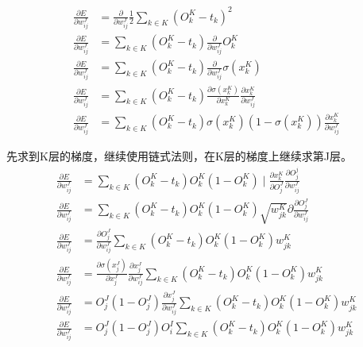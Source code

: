 \documentclass{ctexart}
\begin{document}
\begin{equation}
    \begin{aligned}
    \frac{\partial E}{\partial w_{i j}^{J}} &=\frac{\partial}{\partial w_{i j}^{J}} \frac{1}{2} \sum_{k \in K}\left(O_{k}^{K}-t_{k}\right)^{2} \\
    \frac{\partial E}{\partial w_{i j}^{J}} &=\sum_{k \in K}\left(O_{k}^{K}-t_{k}\right) \frac{\partial}{\partial w_{i j}^{J}} O_{k}^{K} \\
    \frac{\partial E}{\partial w_{i j}^{J}} &=\sum_{k \in K}\left(O_{k}^{K}-t_{k}\right) \frac{\partial}{\partial w_{i j}^{J}} \sigma\left(x_{k}^{K}\right) \\
    \frac{\partial E}{\partial w_{i j}^{J}} &=\sum_{k \in K}\left(O_{k}^{K}-t_{k}\right) \frac{\partial \sigma\left(x_{k}^{K}\right)}{\partial x_{k}^{K}} \frac{\partial x_{k}^{K}}{\partial w_{i j}^{J}} \\
    \frac{\partial E}{\partial w_{i j}^{J}} &=\sum_{k \in K}\left(O_{k}^{K}-t_{k}\right) \sigma\left(x_{k}^{K}\right)\left(1-\sigma\left(x_{k}^{K}\right)\right) \frac{\partial x_{k}^{K}}{\partial w_{i j}^{J}}
    \end{aligned}
    \end{equation}
\par 先求到K层的梯度，继续使用链式法则，在K层的梯度上继续求第J层。
\begin{equation}
    \begin{aligned}
    \frac{\partial E}{\partial w_{i j}^{J}} &=\sum_{k \in K}\left(O_{k}^{K}-t_{k}\right) O_{k}^{K}\left(1-O_{k}^{K}\right) \mid \frac{\partial x_{k}^{K}}{\partial O_{j}^{J}} \frac{\partial O_{j}^{j}}{\partial w_{i j}^{J}} \\
    \frac{\partial E}{\partial w_{i j}^{J}} &=\sum_{k \in K}\left(O_{k}^{K}-t_{k}\right) O_{k}^{K}\left(1-O_{k}^{K}\right) \sqrt{w_{j k}^{K}}{\partial \frac{\partial O_{j}^{J}}{\partial w_{i j}^{J}}} \\
    \frac{\partial E}{\partial w_{i j}^{J}} &=\frac{\partial O_{j}^{J}}{\partial w_{i j}^{J}} \sum_{k \in K}\left(O_{k}^{K}-t_{k}\right) O_{k}^{K}\left(1-O_{k}^{K}\right) w_{j k}^{K} \\
    \frac{\partial E}{\partial w_{i j}^{J}} &=\frac{\partial \sigma\left(x_{j}^{J}\right)}{\partial x_{j}^{J}} \frac{\partial x_{j}^{J}}{\partial w_{i j}^{J}} \sum_{k \in K}\left(O_{k}^{K}-t_{k}\right) O_{k}^{K}\left(1-O_{k}^{K}\right) w_{j k}^{K} \\
    \frac{\partial E}{\partial w_{i j}^{J}} &=O_{j}^{J}\left(1-O_{j}^{J}\right) \frac{\partial x_{j}^{J}}{\partial w_{i j}^{J}} \sum_{k \in K}\left(O_{k}^{K}-t_{k}\right) O_{k}^{K}\left(1-O_{k}^{K}\right) w_{j k}^{K} \\
    \frac{\partial E}{\partial w_{i j}^{J}} &=O_{j}^{J}\left(1-O_{j}^{J}\right) O_{i}^{I} \sum_{k \in K}\left(O_{k}^{K}-t_{k}\right) O_{k}^{K}\left(1-O_{k}^{K}\right) w_{j k}^{K}
    \end{aligned}
    \end{equation}
\end{document}
